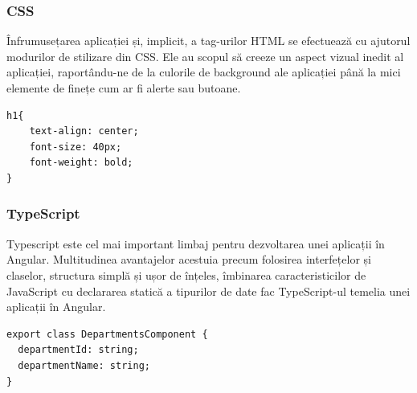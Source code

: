 \vspace{0.5em}

\begin{minipage}{\textwidth}
\hfill
\begin{minipage}{0.9\textwidth}
\subsubsection{CSS}
\end{minipage}
\end{minipage}

\hspace{0cm} Înfrumusețarea aplicației și, implicit, a tag-urilor HTML se efectuează cu ajutorul modurilor de stilizare din CSS. Ele au scopul să creeze un aspect vizual inedit al aplicației, raportându-ne de la culorile de background ale aplicației până la mici elemente de finețe cum ar fi alerte sau butoane.

\begin{center}
\begin{minipage}{0.8\textwidth}
\captionsetup{type=listing}
   \begin{lstlisting}
h1{
    text-align: center;
    font-size: 40px;
    font-weight: bold;
}
\end{lstlisting} 
\end{minipage}
\end{center}

\vspace{0.5em}

\begin{minipage}{\textwidth}
\hfill
\begin{minipage}{0.9\textwidth}
\subsubsection{TypeScript}
\end{minipage}
\end{minipage}

\hspace{0cm} Typescript este cel mai important limbaj pentru dezvoltarea unei aplicații în Angular. Multitudinea avantajelor acestuia precum folosirea interfețelor și claselor, structura simplă și ușor de înțeles, îmbinarea caracteristicilor de JavaScript cu declararea statică a tipurilor de date fac TypeScript-ul temelia unei aplicații în Angular.

\begin{center}
\begin{minipage}{0.8\textwidth}
\captionsetup{type=listing}
   \begin{lstlisting}
export class DepartmentsComponent {
  departmentId: string;
  departmentName: string;
}
\end{lstlisting} 
\end{minipage}
\end{center}

